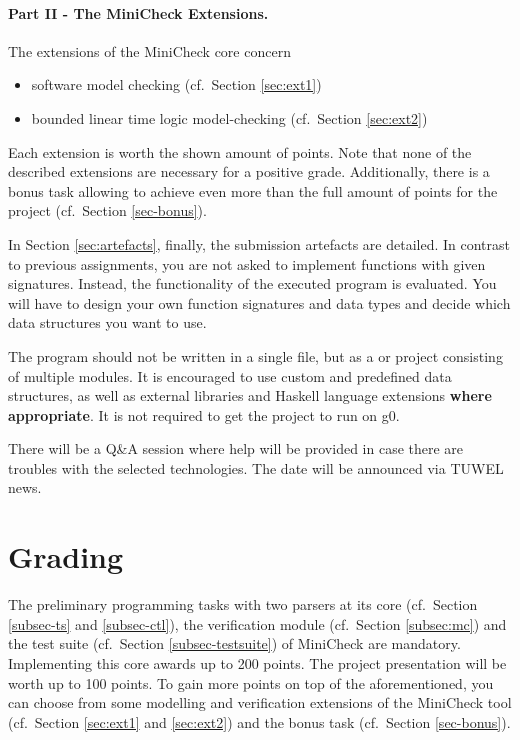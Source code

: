 \documentclass{article}
\begin{document}
\paragraph{Part II - The MiniCheck Extensions.} The extensions of the MiniCheck core concern 
\begin{itemize}
    \item software model checking (cf.~Section \ref{sec:ext1})
    \item bounded linear time logic model-checking (cf.~Section \ref{sec:ext2})
\end{itemize}
Each extension is worth the shown amount of points. Note that none of the described extensions are necessary for a positive grade. Additionally, there is a bonus task allowing to achieve even more than the full amount of points for the project (cf.~Section \ref{sec-bonus}). 
\bigskip

In Section \ref{sec:artefacts}, finally, the submission artefacts are detailed. In contrast to previous assignments, you are not asked to implement functions with given signatures. 
Instead, the functionality of the executed program is evaluated. 
You will have to design your own function signatures and data types and decide 
which data structures you want to use.

The program should not be written in a single file, but as a \href{https://docs.haskellstack.org/en/stable/README/}{} 
or \href{https://cabal.readthedocs.io/en/3.4/}{} project consisting of multiple modules. 
It is encouraged to use custom and predefined data structures, as well as external libraries 
and Haskell language extensions \textbf{where appropriate}. It is not required to get the project to run on g0.

There will be a Q\&A session where help will be provided in case there are troubles with the selected technologies. 
The date will be announced via TUWEL news.

\section{Grading}

The preliminary programming tasks with two parsers at its core (cf.~Section \ref{subsec-ts} and \ref{subsec-ctl}), the verification module (cf.~Section \ref{subsec:mc}) 
and the test suite (cf.~Section \ref{subsec-testsuite}) of MiniCheck are mandatory. 
Implementing this core awards up to 200 points. The project presentation will be worth up to 100 points. 
To gain more points on top of the aforementioned, you can choose from some modelling 
and verification extensions of the MiniCheck tool (cf.~Section \ref{sec:ext1} and \ref{sec:ext2}) and the bonus task (cf.~Section \ref{sec-bonus}).
\end{document}
